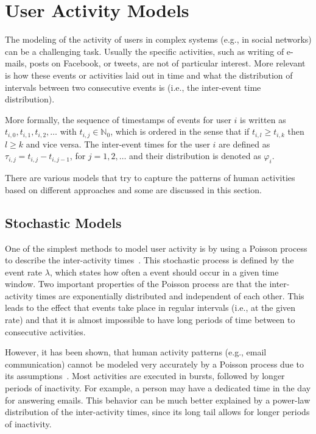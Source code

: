 

\section{User Activity Models}
\label{sec:user-activity-models}

The modeling of the activity of users in complex systems (e.g., in social networks) can be a challenging task.
Usually the specific activities, such as writing of e-mails, posts on  Facebook, or tweets, are not of particular interest.
More relevant is how these events or activities laid out in time and what the distribution of intervals between two consecutive events is (i.e., the inter-event time distribution).

More formally, the sequence of timestamps of events for user \( i \) is written as \(t_{i,0}, t_{i,1}, t_{i,2}, \ldots \) with \( t_{i,j} \in \mathbb{N}_0 \), which is ordered in the sense that if \( t_{i,l} \ge  t_{i,k} \) then \( l \ge k \) and vice versa.
The inter-event times for the user \( i \) are defined as \( \tau_{i,j} = t_{i,j} - t_{i,j-1} \), for \(j = 1, 2, \ldots \) and their distribution is denoted as \( \varphi_{i} \).

There are various models that try to capture the patterns of human activities based on different approaches and some are discussed in this section.


\subsection{Stochastic Models}
\label{subsec:stochastic-models}

One of the simplest methods to model user activity is by using a Poisson process to describe the inter-activity times~\cite{Barabasi2005, Vazquez2006, Masuda2016}.
This stochastic process is defined by the event rate \( \lambda \), which states how often a event should occur in a given time window.
Two important properties of the Poisson process are that the inter-activity times are exponentially distributed and independent of each other.
This leads to the effect that events take place in regular intervals (i.e., at the given rate) and that it is almost impossible to have long periods of time between to consecutive activities.

However, it has been shown, that human activity patterns (e.g., email communication) cannot be modeled very accurately by a Poisson process due to its assumptions~\cite{Barabasi2005}.
Most activities are executed in bursts, followed by longer periods of inactivity.
For example, a person may have a dedicated time in the day for answering emails.
This behavior can be much better explained by a power-law distribution of the inter-activity times, since its long tail allows for longer periods of inactivity.

